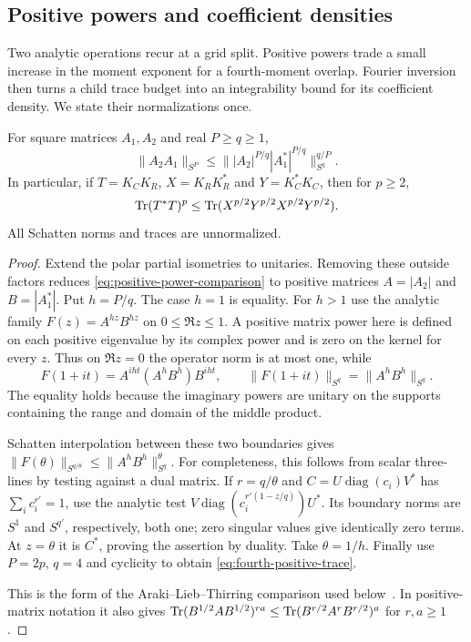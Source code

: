 \subsection{Positive powers and coefficient densities}

Two analytic operations recur at a grid split. Positive powers trade a
small increase in the moment exponent for a fourth-moment overlap.
Fourier inversion then turns a child trace budget into an integrability
bound for its coefficient density. We state their normalizations once.

\begin{lemma}\label{lem:positive-power-comparison}
For square matrices $A_1,A_2$ and real $P\ge q\ge1$,
\begin{equation}\label{eq:positive-power-comparison}
 \|A_2A_1\|_{S^P}
 \le\big\||A_2|^{P/q}|A_1^*|^{P/q}\big\|_{S^q}^{q/P}.
\end{equation}
In particular, if $T=K_CK_R$, $X=K_RK_R^*$ and $Y=K_C^*K_C$,
then for $p\ge2$,
\begin{equation}\label{eq:fourth-positive-trace}
 \operatorname{Tr}(T^*T)^p
 \le\operatorname{Tr}(X^{p/2}Y^{p/2}X^{p/2}Y^{p/2}).
\end{equation}
All Schatten norms and traces are unnormalized.
\end{lemma}
\begin{proof}
Extend the polar partial isometries to unitaries. Removing these
outside factors reduces \eqref{eq:positive-power-comparison} to
positive matrices $A=|A_2|$ and $B=|A_1^*|$. Put $h=P/q$.
The case $h=1$ is equality. For $h>1$ use the analytic family
$F(z)=A^{hz}B^{hz}$ on $0\le\Re z\le1$. A positive matrix power
here is defined on each positive eigenvalue by its complex power
and is zero on the kernel for every $z$. Thus on $\Re z=0$ the
operator norm is at most one, while
\[
 F(1+it)=A^{iht}(A^hB^h)B^{iht},
 \qquad \|F(1+it)\|_{S^q}=\|A^hB^h\|_{S^q}.
\]
The equality holds because the imaginary powers are unitary on the
supports containing the range and domain of the middle product.

Schatten interpolation between these two boundaries gives
$\|F(\theta)\|_{S^{q/\theta}}\le\|A^hB^h\|_{S^q}^{\theta}$.
For completeness, this follows from scalar three-lines by testing
against a dual matrix. If $r=q/\theta$ and
$C=U\operatorname{diag}(c_i)V^*$ has $\sum_i c_i^{r'}=1$,
use the analytic test
$V\operatorname{diag}(c_i^{r'(1-z/q)})U^*$.
Its boundary norms are $S^1$ and $S^{q'}$, respectively, both
one; zero singular values give identically zero terms.
At $z=\theta$ it is $C^*$, proving the assertion by duality.
Take $\theta=1/h$. Finally use $P=2p$, $q=4$ and cyclicity to
obtain \eqref{eq:fourth-positive-trace}.

This is the form of the Araki--Lieb--Thirring comparison used
below~\cite{araki1990,audenaert2007}. In positive-matrix notation
it also gives
$\operatorname{Tr}(B^{1/2}AB^{1/2})^{ra}
\le\operatorname{Tr}(B^{r/2}A^rB^{r/2})^a$ for $r,a\ge1$.
\end{proof}


